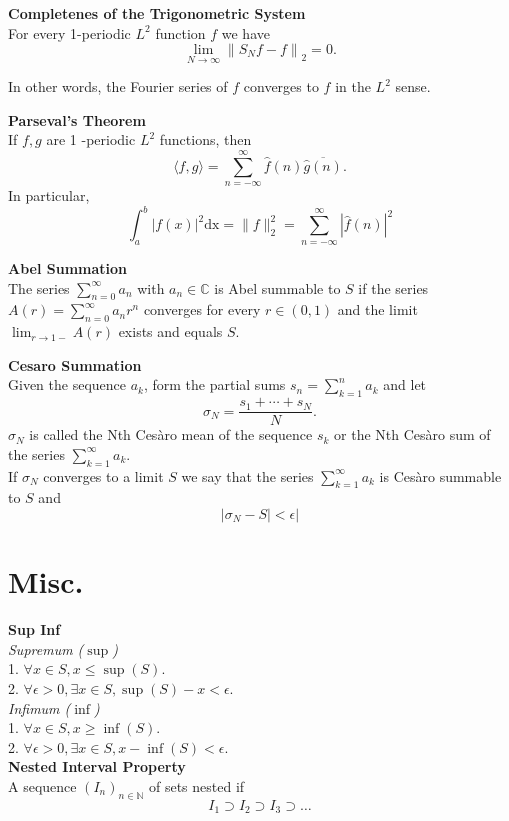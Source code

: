\documentclass[a4paper, 10pt]{article}
\begin{document}
\begin{multicols*}{3}
\textbf{Completenes of the Trigonometric System}\\
For every 1-periodic $L^2$ function $f$ we have
$$
\lim _{N \rightarrow \infty}\left\|S_N f-f\right\|_2=0 .
$$

In other words, the Fourier series of $f$ converges to $f$ in the $L^2$ sense.

\textbf{Parseval's Theorem}\\
If $f, g$ are 1 -periodic $L^2$ functions, then
$$
\langle f, g\rangle=\sum_{n=-\infty}^{\infty} \widehat{f}(n) \overline{\widehat{g}(n)} .
$$
In particular,
$$
\int_a^b|f(x)|^2 \mathrm{dx} = \|f\|_2^2=\sum_{n=-\infty}^{\infty}|\widehat{f}(n)|^2
$$

\textbf{Abel Summation}\\
The series $\sum_{n=0}^{\infty} a_n$ with $a_n \in \mathbb{C}$ is Abel summable to $S$ if the series $A(r)=\sum_{n=0}^{\infty} a_n r^n$ converges for every $r \in(0,1)$ and the limit $\lim _{r \rightarrow 1-} A(r)$ exists and equals $S$.

\textbf{Cesaro Summation}\\
Given the sequence $a_k$, form the partial sums $s_n=\sum_{k=1}^n a_k$ and let
$$
\sigma_N=\frac{s_1+\cdots+s_N}{N} .
$$
$\sigma_N$ is called the Nth Cesàro mean of the sequence $s_k$ or the Nth Cesàro sum of the series $\sum_{k=1}^{\infty} a_k$. \\
If $\sigma_N$ converges to a limit $S$ we say that the series $\sum_{k=1}^{\infty} a_k$ is Cesàro summable to $S$ and 
$$|\sigma_N - S| < \epsilon|$$

\section*{Misc.}

\textbf{Sup Inf}\\
\textit{Supremum ($\sup$)}\\
1. $\forall x \in S, x \leq \sup (S) \text {. }$\\
2. $\forall \epsilon>0, \exists x \in S, \sup (S)-x<\epsilon \text {. }$\\

\textit{Infimum ($\inf$)}\\
1. $\forall x \in S, x \geq \inf (S) \text {. }$\\
2. $\forall \epsilon>0, \exists x \in S, x-\inf (S)<\epsilon .$\\

\textbf{Nested Interval Property}\\
A sequence $\left(I_n\right)_{n \in \mathbb{N}}$ of sets nested if
$$
I_1 \supset I_2 \supset I_3 \supset \ldots
$$


\end{multicols*}
\end{document}
